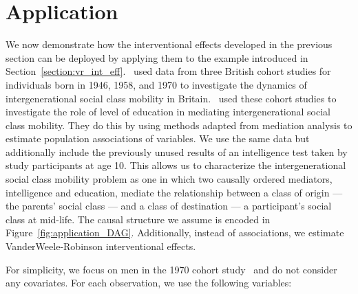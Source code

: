 \chapter{Application}

We now demonstrate how the interventional effects developed in the previous section 
can be deployed by applying them to the example introduced in 
Section~\ref{section:vr_int_eff}.~\cite{kuhaetal2021} used data from three British
cohort studies for individuals born in 1946, 1958, and 1970 to investigate the dynamics
of intergenerational social class mobility in Britain.~\cite{kuhaetal2021}
used these cohort studies to investigate the role of level of education in mediating 
intergenerational social class mobility. They do this by using methods adapted from mediation
analysis to estimate population associations of variables. We use the same data but
additionally include the previously unused results of an intelligence test taken by 
study participants at age 10. This allows us to characterize the intergenerational 
social class mobility problem as one in which two causally ordered mediators, intelligence 
and education, mediate the relationship between a class of origin --- the parents' social 
class --- and a class of destination --- a participant's social class at mid-life. The causal 
structure we assume is encoded in Figure~\ref{fig:application_DAG}. Additionally, 
instead of associations, we estimate VanderWeele-Robinson interventional effects. 

For simplicity, we focus on men in the 1970 cohort study~\citep{cls2026} and do not consider any covariates.
For each observation, we use the following variables:

